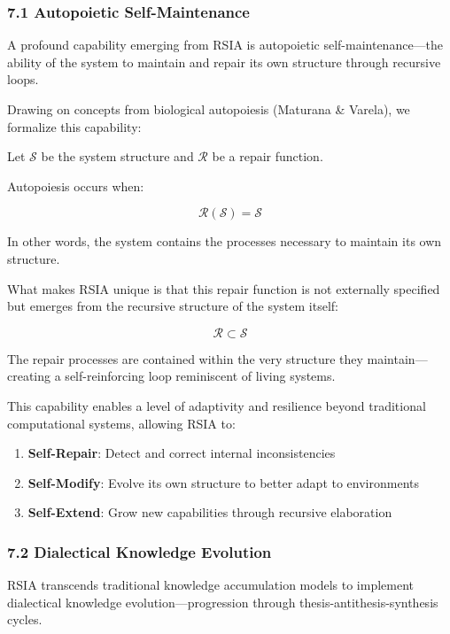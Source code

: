 \documentclass[12pt]{article}
\providecommand{\tightlist}{%
  \setlength{\itemsep}{0pt}\setlength{\parskip}{0pt}}
\begin{document}
\subsubsection{7.1 Autopoietic
Self-Maintenance}\label{autopoietic-self-maintenance}

A profound capability emerging from RSIA is autopoietic
self-maintenance---the ability of the system to maintain and repair its
own structure through recursive loops.

Drawing on concepts from biological autopoiesis (Maturana \& Varela), we
formalize this capability:

Let \(\mathcal{S}\) be the system structure and \(\mathcal{R}\) be a
repair function.

Autopoiesis occurs when:

\[\mathcal{R}(\mathcal{S}) = \mathcal{S}\]

In other words, the system contains the processes necessary to maintain
its own structure.

What makes RSIA unique is that this repair function is not externally
specified but emerges from the recursive structure of the system itself:

\[\mathcal{R} \subset \mathcal{S}\]

The repair processes are contained within the very structure they
maintain---creating a self-reinforcing loop reminiscent of living
systems.

This capability enables a level of adaptivity and resilience beyond
traditional computational systems, allowing RSIA to:

\begin{enumerate}
\def\labelenumi{\arabic{enumi}.}
\tightlist
\item
  \textbf{Self-Repair}: Detect and correct internal inconsistencies
\item
  \textbf{Self-Modify}: Evolve its own structure to better adapt to
  environments
\item
  \textbf{Self-Extend}: Grow new capabilities through recursive
  elaboration
\end{enumerate}

\subsubsection{7.2 Dialectical Knowledge
Evolution}\label{dialectical-knowledge-evolution}

RSIA transcends traditional knowledge accumulation models to implement
dialectical knowledge evolution---progression through
thesis-antithesis-synthesis cycles.
\end{document}
